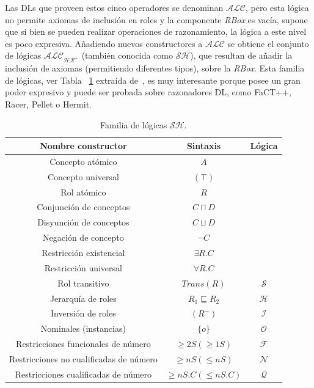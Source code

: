 Las DLs que proveen estos cinco operadores se denominan $\mathcal{ALC}$, pero
esta lógica no permite axiomas de inclusión en roles y la componente 
\textit{RBox} es vacía, supone que si bien se pueden realizar operaciones
de razonamiento, la lógica a este nivel es poco expresiva. Añadiendo nuevos
constructores a $\mathcal{ALC}$ se obtiene el conjunto de lógicas
$\mathcal{ALC_{HR^+}}$ (también conocida como $\mathcal{SH}$), que resultan de añadir la
inclusión de axiomas (permitiendo diferentes tipos), sobre la \textit{RBox}.
Esta familia de lógicas, ver Tabla ~\ref{table:sh} extraída de~\cite{Cuenca}, es muy
interesante porque posee un gran poder expresivo y puede ser probada sobre razonadores DL, como FaCT++, Racer, Pellet o Hermit.


\begin{table}[htb]
\renewcommand{\arraystretch}{1.3}
\begin{center}
\begin{tabular}{|c|c|c|}
\hline
\textbf{Nombre constructor}&\textbf{Sintaxis}&\textbf{Lógica}\\
\hline
Concepto atómico& $A$ & \\
Concepto universal& $(\top)$ & \\
Rol atómico& $R$ & \\
Conjunción de conceptos& $C \sqcap D$ & \\
Disyunción de conceptos& $C \sqcup D$ & \\
Negación de concepto& $\neg C$ & \\
Restricción existencial& $\exists R.C$ & \\
Restricción universal& $\forall R.C$ & \\
Rol transitivo& $Trans(R)$ & $\mathcal{S}$\\
\hline
Jerarquía de roles& $R_1 \sqsubseteq R_2$ & $\mathcal{H}$\\
\hline
Inversión de roles& $(R^-)$ & $\mathcal{I}$\\
\hline
Nominales (instancias)& $\{o\}$ & $\mathcal{O}$\\
\hline
Restricciones funcionales de número& $\geq 2S  (\geq 1S)$ &
$\mathcal{F}$\\ \hline

Restricciones no cualificadas de número& $\geq nS  (\leq nS)$ &
$\mathcal{N}$\\ 

\hline

Restricciones cualificadas de número& $\geq nS.C  (\leq nS.C)$ &
$\mathcal{Q}$\\ 

\hline
\hline

\end{tabular}
\caption{Familia de lógicas $\mathcal{SH}$.}
\label{table:sh}
\end{center}
\end{table}

